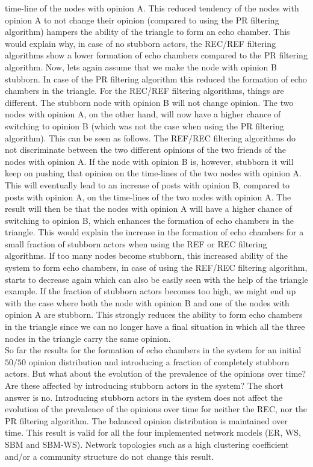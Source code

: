 \documentclass[11 pt , letterpaper , twoside , openright]{book}
\begin{document}
time-line of the nodes with opinion A. This reduced tendency of the nodes with opinion A to not change their opinion (compared to using the PR filtering algorithm) hampers the ability of the triangle to form an echo chamber. This would explain why, in case of no stubborn actors, the REC/REF filtering algorithms show a lower formation of echo chambers compared to the PR filtering algorithm. Now, lets again assume that we make the node with opinion B stubborn. In case of the PR filtering algorithm this reduced the formation of echo chambers in the triangle. For the REC/REF filtering algorithms, things are different. The stubborn node with opinion B will not change opinion. The two nodes with opinion A, on the other hand, will now have a higher chance of switching to opinion B (which was not the case when using the PR filtering algorithm). This can be seen as follows. The REF/REC filtering algorithms do not discriminate between the two different opinions of the two friends of the nodes with opinion A. If the node with opinion B is, however, stubborn it will keep on pushing that opinion on the time-lines of the two nodes with opinion A. This will eventually lead to an increase of posts with opinion B, compared to posts with opinion A, on the time-lines of the two nodes with opinion A. The result will then be that the nodes with opinion A will have a higher chance of switching to opinion B, which enhances the formation of echo chambers in the triangle. This would explain the increase in the formation of echo chambers for a small fraction of stubborn actors when using the REF or REC filtering algorithms. If too many nodes become stubborn, this increased ability of the system to form echo chambers, in case of using the REF/REC filtering algorithm, starts to decrease again which can also be easily seen with the help of the triangle example. If the fraction of stubborn actors becomes too high, we might end up with the case where both the node with opinion B and one of the nodes with opinion A are stubborn. This strongly reduces the ability to form echo chambers in the triangle since we can no longer have a final situation in which all the three nodes in the triangle carry the same opinion.\\
\newline
So far the results for the formation of echo chambers in the system for an initial $50/50$ opinion distribution and introducing a fraction of completely stubborn actors. But what about the evolution of the prevalence of the opinions over time? Are these affected by introducing stubborn actors in the system? The short answer is no. Introducing stubborn actors in the system does not affect the evolution of the prevalence of the opinions over time for neither the REC, nor the PR filtering algorithm. The balanced opinion distribution is maintained over time. This result is valid for all the four implemented network models (ER, WS, SBM and SBM-WS). Network topologies such as a high clustering coefficient and/or a community structure do not change this result. \\%
\end{document}
